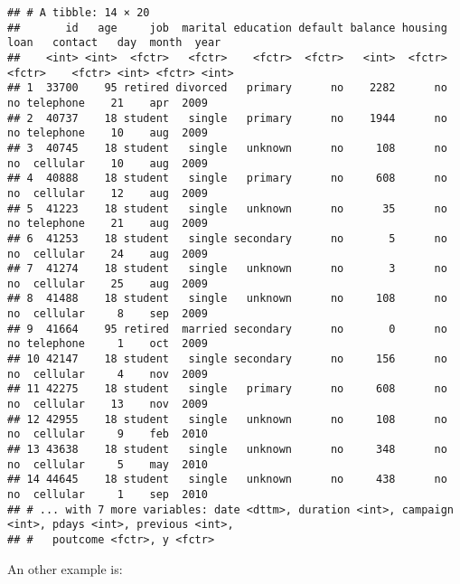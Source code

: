 \documentclass[]{book}
\newenvironment{Shaded}{\begin{snugshade}}{\end{snugshade}}
\newcommand{\KeywordTok}[1]{\textcolor[rgb]{0.13,0.29,0.53}{\textbf{{#1}}}}
\newcommand{\StringTok}[1]{\textcolor[rgb]{0.31,0.60,0.02}{{#1}}}
\newcommand{\CommentTok}[1]{\textcolor[rgb]{0.56,0.35,0.01}{\textit{{#1}}}}
\newcommand{\NormalTok}[1]{{#1}}
\begin{document}
\begin{verbatim}
## # A tibble: 14 × 20
##       id   age     job  marital education default balance housing   loan   contact   day  month  year
##    <int> <int>  <fctr>   <fctr>    <fctr>  <fctr>   <int>  <fctr> <fctr>    <fctr> <int> <fctr> <int>
## 1  33700    95 retired divorced   primary      no    2282      no     no telephone    21    apr  2009
## 2  40737    18 student   single   primary      no    1944      no     no telephone    10    aug  2009
## 3  40745    18 student   single   unknown      no     108      no     no  cellular    10    aug  2009
## 4  40888    18 student   single   primary      no     608      no     no  cellular    12    aug  2009
## 5  41223    18 student   single   unknown      no      35      no     no telephone    21    aug  2009
## 6  41253    18 student   single secondary      no       5      no     no  cellular    24    aug  2009
## 7  41274    18 student   single   unknown      no       3      no     no  cellular    25    aug  2009
## 8  41488    18 student   single   unknown      no     108      no     no  cellular     8    sep  2009
## 9  41664    95 retired  married secondary      no       0      no     no telephone     1    oct  2009
## 10 42147    18 student   single secondary      no     156      no     no  cellular     4    nov  2009
## 11 42275    18 student   single   primary      no     608      no     no  cellular    13    nov  2009
## 12 42955    18 student   single   unknown      no     108      no     no  cellular     9    feb  2010
## 13 43638    18 student   single   unknown      no     348      no     no  cellular     5    may  2010
## 14 44645    18 student   single   unknown      no     438      no     no  cellular     1    sep  2010
## # ... with 7 more variables: date <dttm>, duration <int>, campaign <int>, pdays <int>, previous <int>,
## #   poutcome <fctr>, y <fctr>
\end{verbatim}

An other example is:

\begin{Shaded}
\end{Shaded}
\end{document}
